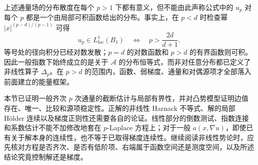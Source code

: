 \ProseParagraphBreak

上述通量场的分布散度在每个 \(p>1\) 下都有意义，但不能由此声称公式中的 \(u_p\) 对每个 \(p\) 都是一个由局部可积函数给出的分布。事实上，在 \(p<d\) 时检查幂 \(|x|^{(p-d)/(p-1)}\) 可得
\[
 u_p\in L^1_{\mathrm{loc}}(B_1)
 \quad\Longleftrightarrow\quad p>\frac{2d}{d+1}.
\]
等号处的径向积分已经对数发散；\(p=d\) 的对数函数和 \(p>d\) 的有界函数则可积。因此一般指数下始终成立的是关于 \(\mathcal A\) 的分布恒等式，而非对任意分布都已定义了非线性算子 \(\Delta_p\)。在 \(p>d\) 的范围内，函数、弱梯度、通量和对偶源项才全部落入前面建立的能量框架。

\ProseParagraphBreak

本节已证明一般齐次 \(p\) 次通量的截断估计与局部有界性，并对凸势模型证明边值存在、唯一、比较和源项稳定性。正解的非线性 Harnack 不等式、解的局部 Hölder 连续以及梯度正则性还需要各自的论证。线性部分的倒数测试、指数连接和系数估计不能不加修改地套在 \(p\)-Laplace 方程上；对于一般 \(a(x,\nabla u)\)，即使已有关于解本身的连续性，也不等于已取得梯度连续性。继续阅读非线性势论时，应先核对方程是否齐次、是否有低阶项、右端属于函数空间还是测度空间，以及所述结论究竟控制解还是梯度。
